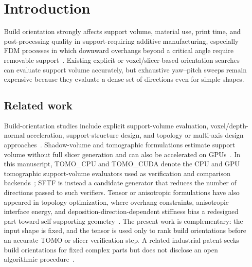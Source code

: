 \documentclass[12pt]{article}
\begin{document}
\section{Introduction}

Build orientation strongly affects support volume, material use, print time, and
post-processing quality in support-requiring additive manufacturing, especially FDM
processes in which downward overhangs beyond a critical angle require removable
support~\cite{gibson}. Existing explicit or voxel/slicer-based orientation searches
can evaluate support volume accurately, but exhaustive yaw--pitch sweeps remain
expensive because they evaluate a dense set of directions even for simple shapes.

\subsection{Related work}
\label{sec:related}
Build-orientation studies include explicit support-volume evaluation, voxel/depth-normal
acceleration, support-structure design, and topology or multi-axis design
approaches~\cite{das2017,wang2010,vaissier2019,jiang2018,mirzendehdel2016,langelaar2018,dai2018}.
Shadow-volume and tomographic formulations estimate support volume without full
slicer generation and can also be accelerated on GPUs~\cite{ezair,msst,gpumsst}. In
this manuscript, TOMO\_CPU and TOMO\_CUDA denote the CPU and GPU tomographic
support-volume evaluators used as verification and comparison backends~\cite{gpumsst};
SFTF is instead a candidate generator that reduces the number of directions passed
to such verifiers. Tensor or anisotropic formulations have also appeared in topology
optimization, where overhang constraints, anisotropic interface energy, and
deposition-direction-dependent stiffness bias a redesigned part toward
self-supporting geometry~\cite{gaynor2014,garcke2023,shin2025}. The present work is
complementary: the input shape is fixed, and the tensor is used only to rank build
orientations before an accurate TOMO or slicer verification step. A related
industrial patent seeks build orientations for fixed complex parts but does not
disclose an open algorithmic procedure~\cite{smith2025patent}.
\end{document}
